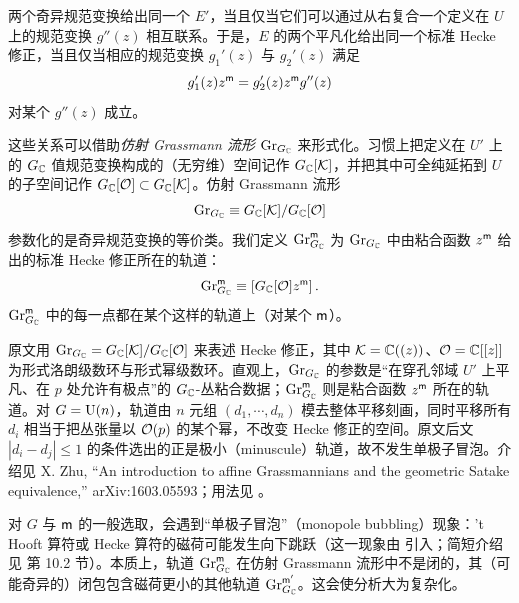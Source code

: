 两个奇异规范变换给出同一个 $E'$，当且仅当它们可以通过从右复合一个定义在 $U$ 上的规范变换 $g''(z)$ 相互联系。于是，$E$ 的两个平凡化给出同一个标准 Hecke 修正，当且仅当相应的规范变换 $g_1'(z)$ 与 $g_2'(z)$ 满足
\begin{equation}
g_1'(z)z^{\sf m} = g_2'(z)z^{\sf m} g''(z)
\end{equation}
对某个 $g''(z)$ 成立。

这些关系可以借助{\it 仿射 Grassmann 流形} ${\mathrm{Gr}}_{G_{\mathbb C}}$ 来形式化。习惯上把定义在 $U'$ 上的 $G_{\mathbb C}$ 值规范变换构成的（无穷维）空间记作 $G_{\mathbb C}[{\cal K}]$，并把其中可全纯延拓到 $U$ 的子空间记作 $G_{\mathbb C}[{\cal O}]\subset G_{\mathbb C}[{\cal K}]$。仿射 Grassmann 流形
\begin{equation}
{\mathrm{Gr}}_{G_{\mathbb C}} \equiv G_{\mathbb C}[{\cal K}]/G_{\mathbb C}[{\cal O}]
\end{equation}
参数化的是奇异规范变换的等价类。我们定义 ${\mathrm{Gr}}^{\sf m}_{G_{\mathbb C}}$ 为 ${\mathrm{Gr}}_{G_{\mathbb C}}$ 中由粘合函数 $z^{\sf m}$ 给出的标准 Hecke 修正所在的轨道：
\begin{equation}
{\mathrm{Gr}}^{\sf m}_{G_{\mathbb C}} \equiv \left[G_{\mathbb C}[{\cal O}] z^{\sf m} \right].
\end{equation}
${\mathrm{Gr}}^{\sf m}_{G_{\mathbb C}}$ 中的每一点都在某个这样的轨道上（对某个 ${\sf m}$）。
\begin{yizhu}
原文用 ${\mathrm{Gr}}_{G_{\mathbb C}}=G_{\mathbb C}[{\cal K}]/G_{\mathbb C}[{\cal O}]$ 来表述 Hecke 修正，其中 ${\cal K}={\mathbb C}((z))$、${\cal O}={\mathbb C}[[z]]$ 为形式洛朗级数环与形式幂级数环。直观上，${\mathrm{Gr}}_{G_{\mathbb C}}$ 的参数是“在穿孔邻域 $U'$ 上平凡、在 $p$ 处允许有极点”的 $G_{\mathbb C}$-丛粘合数据；${\mathrm{Gr}}^{\sf m}_{G_{\mathbb C}}$ 则是粘合函数 $z^{\sf m}$ 所在的轨道。对 $G={\mathrm U}(n)$，轨道由 $n$ 元组 $(d_1,\cdots,d_n)$ 模去整体平移刻画，同时平移所有 $d_i$ 相当于把丛张量以 ${\mathcal O}(p)$ 的某个幂，不改变 Hecke 修正的空间。原文后文 $|d_i-d_j|\leq 1$ 的条件选出的正是极小（minuscule）轨道，故不发生单极子冒泡。介绍见 X. Zhu, “An introduction to affine Grassmannians and the geometric Satake equivalence,” arXiv:1603.05593；用法见 \cite{BD}。
\end{yizhu}


对 $G$ 与 ${\sf m}$ 的一般选取，会遇到“单极子冒泡”（monopole bubbling）现象：'t Hooft 算符或 Hecke 算符的磁荷可能发生向下跳跃（这一现象由 \cite{Kron,Pauly} 引入；简短介绍见 \cite{KW} 第 10.2 节）。本质上，轨道 ${\mathrm{Gr}}^{\sf m}_{G_{\mathbb C}}$ 在仿射 Grassmann 流形中不是闭的，其（可能奇异的）闭包包含磁荷更小的其他轨道 ${\mathrm{Gr}}^{{\sf m}'}_{G_{\mathbb C}}$。这会使分析大为复杂化。


